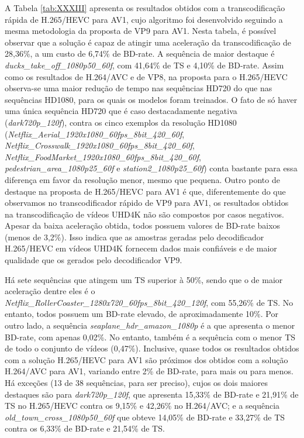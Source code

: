A Tabela \ref{tab:XXXIII} apresenta os resultados obtidos com a transcodificação rápida de H.265/HEVC para AV1, cujo algoritmo foi desenvolvido seguindo a mesma metodologia da proposta de VP9 para AV1. Nesta tabela, é possível observar que a solução é capaz de atingir uma aceleração da transcodificação de 28,36\%, a um custo de 6,74\% de BD-rate. A sequência de maior destaque é \textit{ducks\_take\_off\_1080p50\_60f}, com 41,64\% de TS e 4,10\% de BD-rate. Assim como os resultados de H.264/AVC e de VP8, na proposta para o H.265/HEVC observa-se uma maior redução de tempo nas sequências HD720 do que nas sequências HD1080, para os quais os modelos foram treinados. O fato de só haver uma única sequência HD720 que é caso destacadamente negativa (\textit{dark720p\_120f}), contra os cinco exemplos da resolução HD1080 (\textit{Netflix\_Aerial\_1920x1080\_60fps\_8bit\_420\_60f}, \textit{Netflix\_Crosswalk\_1920x1080\_60fps\_8bit\_420\_60f}, \textit{Netflix\_FoodMarket\_1920x1080\_60fps\_8bit\_420\_60f}, \textit{pedestrian\_area\_1080p25\_60f} e \textit{station2\_1080p25\_60f}) conta bastante para essa diferença em favor da resolução menor, mesmo que pequena. Outro ponto de destaque na proposta de H.265/HEVC para AV1 é que, diferentemente do que observamos no transcodificador rápido de VP9 para AV1, os resultados obtidos na transcodificação de vídeos UHD4K não são compostos por casos negativos. Apesar da baixa aceleração obtida, todos possuem valores de BD-rate baixos (menos de 3,2\%). Isso indica que as amostras geradas pelo decodificador H.265/HEVC em vídeos UHD4K fornecem dados mais confiáveis e de maior qualidade que os gerados pelo decodificador VP9.



Há sete sequências que atingem um TS superior à 50\%, sendo que o de maior aceleração dentre eles é o \textit{Netflix\_RollerCoaster\_1280x720\_60fps\_8bit\_420\_120f}, com 55,26\% de TS. No entanto, todos possuem um BD-rate elevado, de aproximadamente 10\%. Por outro lado, a sequência \textit{seaplane\_hdr\_amazon\_1080p} é a que apresenta o menor BD-rate, com apenas 0,02\%. No entanto, também é a sequência com o menor TS de todo o conjunto de vídeos (0,47\%). Inclusive, quase todos os resultados obtidos com a solução H.265/HEVC para AV1 são próximos dos obtidos com a solução H.264/AVC para AV1, variando entre 2\% de BD-rate, para mais ou para menos. Há exceções (13 de 38 sequências, para ser preciso), cujos os dois maiores destaques são para \textit{dark720p\_120f}, que apresenta 15,33\% de BD-rate e 21,91\% de TS no H.265/HEVC contra os 9,15\% e 42,26\% no H.264/AVC; e a sequência \textit{old\_town\_cross\_1080p50\_60f} que obteve 14,05\% de BD-rate e 33,27\% de TS contra os 6,33\% de BD-rate e 21,54\% de TS. 

